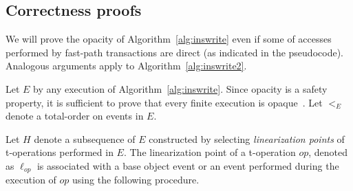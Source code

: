 \subsection{Correctness proofs}
\label{sec:proofs}
%
We will prove the opacity of Algorithm~\ref{alg:inswrite} even if some of accesses performed by fast-path transactions are direct (as indicated in the pseudocode).
Analogous arguments apply to Algorithm~\ref{alg:inswrite2}.
%

Let $E$ by any execution of Algorithm~\ref{alg:inswrite}. 
Since opacity is a safety property, it is sufficient to prove that every finite execution is opaque~\cite{icdcs-opacity}.
Let $<_E$ denote a total-order on events in $E$.

Let $H$ denote a subsequence of $E$ constructed by selecting
\emph{linearization points} of t-operations performed in $E$.
The linearization point of a t-operation $op$, denoted as $\ell_{op}$ is associated with  
a base object event or an event performed during 
the execution of $op$ using the following procedure. 


